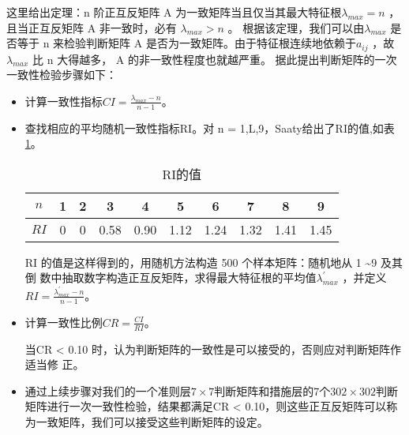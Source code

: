 \documentclass{cumcmthesis}
\begin{document}
这里给出定理：n 阶正互反矩阵 A 为一致矩阵当且仅当其最大特征根$\lambda_{max} = n$ ，且当正互反矩阵 A 非一致时，必有 $\lambda_{max}> n$ 。 根据该定理，我们可以由$\lambda_{max}$ 是否等于 n 来检验判断矩阵 A 是否为一致矩阵。由于特征根连续地依赖于$a_{ij}$ ，故 $\lambda_{max}$ 比 n 大得越多， A 的非一致性程度也就越严重。
据此提出判断矩阵的一次一致性检验步骤如下：
\begin{itemize}
    \item 计算一致性指标$CI = \frac{\lambda_{max}-n}{n-1}$。
    \item 查找相应的平均随机一致性指标RI。对 n = 1,L,9，Saaty给出了RI的值,如表\ref{RIde}。
    \begin{table}[H]
        \label{tablesymbol}
        \centering
        \begin{tabular}{c|ccccccccc}   
        \hline 
        $n$  &  1 & 2 & 3 & 4 & 5 & 6 & 7 & 8 & 9\\
        \hline
        $RI$  &  0 & 0 & 0.58 & 0.90 & 1.12 & 1.24 & 1.32 & 1.41 & 1.45\\
        \hline
        \end{tabular}
        \caption{RI的值}
        \label{RIde}
    
    \end{table}
    RI 的值是这样得到的，用随机方法构造 500 个样本矩阵：随机地从 1 \textasciitilde 9 及其倒
数中抽取数字构造正互反矩阵，求得最大特征根的平均值$\lambda^{'}_{max}$ ，并定义$RI = \frac{\lambda^{'}_{max}-n}{n-1}$。
    \item 计算一致性比例$CR = \frac{CI}{RI}$。
    
    当CR < 0.10 时，认为判断矩阵的一致性是可以接受的，否则应对判断矩阵作适当修
正。
    \item 通过上续步骤对我们的一个准则层$7 \times 7$判断矩阵和措施层的7个$302 \times 302$判断矩阵进行一次一致性检验，结果都满足CR < 0.10，则这些正互反矩阵可以称为一致矩阵，我们可以接受这些判断矩阵的设定。 
\end{itemize}
\end{document}
